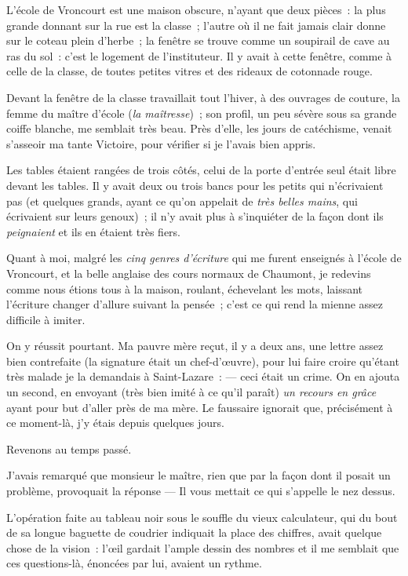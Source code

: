 \documentclass[french,twoside]{book} %
\begin{document}
L’école de Vroncourt est une maison obscure, n’ayant que deux pièces : la plus grande donnant sur la rue est la classe ; l’autre où il ne fait jamais clair donne sur le coteau plein d’herbe ; la fenêtre se trouve comme un soupirail de cave au ras du sol : c’est le logement de l’instituteur. Il y avait à cette fenêtre, comme à celle de la classe, de toutes petites vitres et des rideaux de cotonnade rouge.\par
Devant la fenêtre de la classe travaillait tout l’hiver, à des ouvrages de couture, la femme du maître d’école (\emph{la maîtresse}) ; son profil, un peu sévère sous sa grande coiffe blanche, me semblait très beau. Près d’elle, les jours de catéchisme, venait s’asseoir ma tante Victoire, pour vérifier si je l’avais bien appris.\par
 Les tables étaient rangées de trois côtés, celui de la porte d’entrée seul était libre devant les tables. Il y avait deux ou trois bancs pour les petits qui n’écrivaient pas (et quelques grands, ayant ce qu’on appelait de \emph{très belles mains}, qui écrivaient sur leurs genoux) ; il n’y avait plus à s’inquiéter de la façon dont ils \emph{peignaient} et ils en étaient très fiers.\par
Quant à moi, malgré les \emph{cinq genres d’écriture} qui me furent enseignés à l’école de Vroncourt, et la belle anglaise des cours normaux de Chaumont, je redevins comme nous étions tous à la maison, roulant, échevelant les mots, laissant l’écriture changer d’allure suivant la pensée ; c’est ce qui rend la mienne assez difficile à imiter.\par
On y réussit pourtant. Ma pauvre mère reçut, il y a deux ans, une lettre assez bien contrefaite (la signature était un chef-d’œuvre), pour lui faire croire qu’étant très malade je la demandais à Saint-Lazare : — ceci était un crime. On en ajouta un second, en envoyant (très bien imité à ce qu’il paraît) \emph{un recours en grâce} ayant pour but d’aller près de ma mère. Le faussaire ignorait que, précisément à ce moment-là, j’y étais depuis quelques jours.\par
Revenons au temps passé.\par
J’avais remarqué que monsieur le maître, rien  que par la façon dont il posait un problème, provoquait la réponse — Il vous mettait ce qui s’appelle le nez dessus.\par
L’opération faite au tableau noir sous le souffle du vieux calculateur, qui du bout de sa longue baguette de coudrier indiquait la place des chiffres, avait quelque chose de la vision : l’œil gardait l’ample dessin des nombres et il me semblait que ces questions-là, énoncées par lui, avaient un rythme.\par
\end{document}
